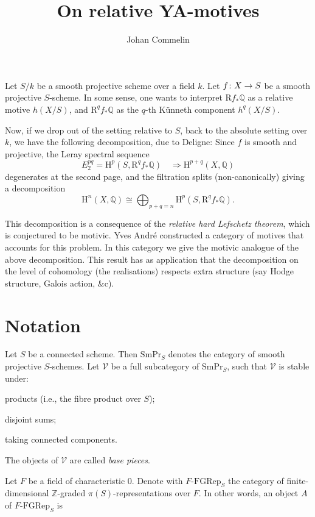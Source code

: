 \documentclass[a4paper,10pt]{article}
\title{On relative YA-motives}
\author{Johan Commelin}
\def\basepieces{\mathscr{V}}
\def\smpr{\mathrm{SmPr}}
\newcommand{\fgrep}[2]{#1\textrm{-}\mathrm{FGRep}_{#2}}
\def\coh{\mathrm{H}}
\begin{document}
\maketitle

Let $S/k$ be a smooth projective scheme over a field $k$. Let
$\map[f]{X}{S}$ be a smooth projective $S$-scheme. In some sense, one
wants to interpret $\mathrm{R}f_{*}\mathbb{Q}$ as a relative motive $h(X/S)$,
and $\mathrm{R}^{q}f_{*}\mathbb{Q}$ as the $q$-th K\"{u}nneth component
$h^{q}(X/S)$.

Now, if we drop out of the setting relative to $S$, back to the absolute
setting over $k$, we have the following decomposition, due to Deligne:
Since $f$ is smooth and projective, the Leray spectral sequence
\[
	E_{2}^{pq} = \coh^{p}(S, \mathrm{R}^{q}f_{*}\mathbb{Q})
	\quad \Longrightarrow \coh^{p+q}(X, \mathbb{Q})
\]
degenerates at the second page, and the filtration splits (non-canonically)
giving a decomposition
\[
	\coh^{n}(X, \mathbb{Q}) \cong \bigoplus_{p+q = n}
	\coh^{p}(S, \mathrm{R}^{q}f_{*}\mathbb{Q}).
\]

This decomposition is a consequence of the \emph{relative hard Lefschetz
theorem}, which is conjectured to be motivic. Yves Andr\'{e} constructed a
category of motives that accounts for this problem. In this category we give
the motivic analogue of the above decomposition. This result has as application
that the decomposition on the level of cohomology (the realisations) respects
extra structure (say Hodge structure, Galois action, \&c).

\section{Notation} \label{notation}

Let $S$ be a connected scheme. Then $\smpr_{S}$ denotes the category of smooth
projective $S$-schemes. Let $\basepieces$ be a full subcategory of $\smpr_{S}$,
such that $\basepieces$ is stable under:
\begin{enumerate*}[label=(\alph*)] %
	\item products (i.e., the fibre product over $S$);
	\item disjoint sums;
	\item taking connected components.
\end{enumerate*} %
The objects of $\basepieces$ are called \emph{base pieces}.

Let $F$ be a field of characteristic $0$. Denote with $\fgrep{F}{S}$ the
category of finite-dimensional $\mathbb{Z}$-graded $\pi(S)$-representations
over $F$. In other words, an object $A$ of $\fgrep{F}{S}$ is
\end{document}
